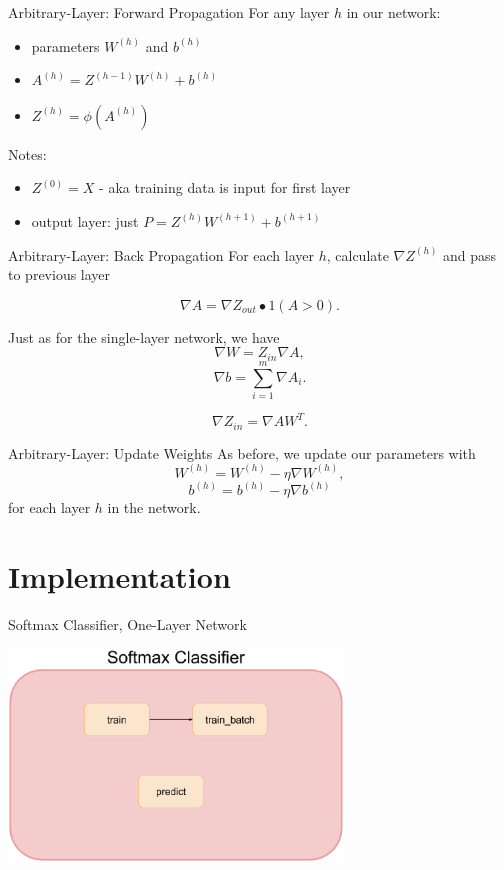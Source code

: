 \documentclass{beamer}
\begin{document}
  \begin{frame}{Arbitrary-Layer: Forward Propagation}
    For any layer $h$ in our network:
    \begin{itemize}
      \item parameters $W^{(h)}$ and $b^{(h)}$
      \item $A^{(h)} = Z^{(h-1)} W^{(h)} + b^{(h)}$
      \item $Z^{(h)} = \phi\left( A^{(h)} \right)$
    \end{itemize}

    Notes:
    \begin{itemize}
      \item $Z^{(0)} = X$ - aka training data is input for first layer
      \item output layer: just $P = Z^{(h)} W^{(h+1)} + b^{(h+1)}$
    \end{itemize}
  \end{frame}

  \begin{frame}{Arbitrary-Layer: Back Propagation}
    For each layer $h$, calculate $\nabla Z^{(h)}$ and pass to previous layer

    $$ \nabla A = \nabla Z_{out} \bullet 1\left( A > 0 \right).$$

    Just as for the single-layer network, we have
    $$ \nabla W = Z_{in} \nabla A, $$
    $$ \nabla b = \sum_{i=1}^m \nabla A_i. $$

    $$ \nabla Z_{in} = \nabla A W^T. $$

  \end{frame}

  \begin{frame}{Arbitrary-Layer: Update Weights}
    As before, we update our parameters with
      $$ W^{(h)} = W^{(h)} - \eta \nabla W^{(h)}, $$
      $$ b^{(h)} = b^{(h)} - \eta \nabla b^{(h)} $$
    for each layer $h$ in the network.
  \end{frame}

  \section{Implementation}

  \begin{frame}{Softmax Classifier, One-Layer Network}
    \begin{center}
      \includegraphics[width=3.5in]{../figures/softmax_drawing.eps}
    \end{center}
  \end{frame}
\end{document}

